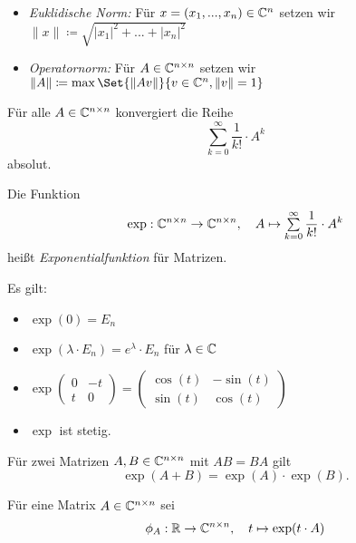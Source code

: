 \documentclass{cheat-sheet}
\begin{document}
\begin{defn}
\begin{itemize}
  \item \emph{Euklidische Norm:} Für $x = (x_1, ..., x_n) \in \mathbb{C}^n$ setzen wir $\| x \| \coloneqq \sqrt{|x_1|^2 + ... + |x_n|^2}$
  \item \emph{Operatornorm:} Für $A \in \mathbb{C}^{n \times n}$ setzen wir $\| A \| \coloneqq \max \Set{ \| Av \| }{ v \in \C^n, \| v \| = 1 }$
\end{itemize}
\end{defn}


\begin{satz}
Für alle $A \in \mathbb{C}^{n \times n}$ konvergiert die Reihe
\[ \sum_{k=0}^\infty \frac{1}{k!} \cdot A^k \]
absolut.
\end{satz}

\begin{defn}
Die Funktion
\[ \exp : \C^{n \times n} \to \C^{n \times n}, \quad A \mapsto \sum_{k=0}^{\infty} \frac{1}{k!} \cdot A^k \]
heißt \emph{Exponentialfunktion} für Matrizen.
\end{defn}

\begin{bem}
Es gilt:
\begin{itemize}
  \item $\exp(0) = E_n$
  \item $\exp(\lambda \cdot E_n) = e^\lambda \cdot E_n$ für $\lambda \in \mathbb{C}$
  \item $\exp \begin{pmatrix} 0 & -t \\ t & 0 \end{pmatrix} = \begin{pmatrix} \cos(t) & -\sin(t) \\ \sin(t) & \cos(t) \end{pmatrix}$
  \item $\exp$ ist stetig.
\end{itemize}
\end{bem}

\begin{satz}
Für zwei Matrizen $A, B \in \mathbb{C}^{n \times n}$ mit $AB = BA$ gilt
\[ \exp(A + B) = \exp(A) \cdot \exp(B). \]
\end{satz}

\begin{defn}
Für eine Matrix $A \in \mathbb{C}^{n \times n}$ sei
\[ \phi_A : \mathbb{R} \to \mathbb{C}^{n \times n},\quad t \mapsto \exp(t \cdot A) \]
\end{defn}
\end{document}
